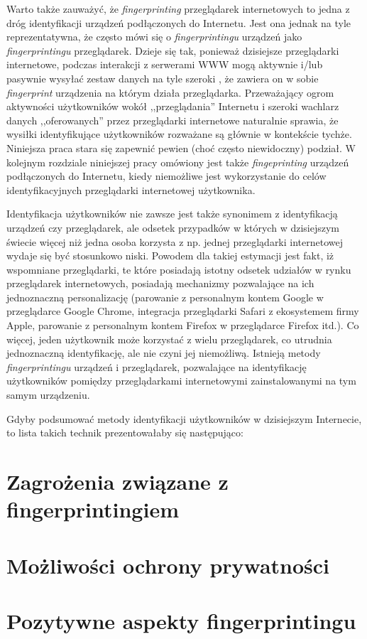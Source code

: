 Warto także zauważyć, że \emph{fingerprinting} przeglądarek internetowych to
jedna z dróg identyfikacji urządzeń podłączonych do Internetu. Jest ona jednak
na tyle reprezentatywna, że często mówi się o \emph{fingerprintingu} urządzeń
jako \emph{fingerprintingu} przeglądarek. Dzieje się tak, ponieważ dzisiejsze
przeglądarki internetowe, podczas interakcji z serwerami WWW mogą aktywnie i/lub
pasywnie wysyłać zestaw danych na tyle szeroki \cite{eckersley2010unique}, że
zawiera on w sobie \emph{fingerprint} urządzenia na którym działa przeglądarka.
Przeważający ogrom aktywności użytkowników wokół ,,przeglądania'' Internetu i
szeroki wachlarz danych ,,oferowanych'' przez przeglądarki internetowe
naturalnie sprawia, że wysiłki identyfikujące użytkowników rozważane są głównie
w kontekście tychże. Niniejsza praca stara się zapewnić pewien (choć często
niewidoczny) podział. W kolejnym rozdziale niniejszej pracy omówiony jest także
\emph{fingeprinting} urządzeń podłączonych do Internetu, kiedy niemożliwe jest
wykorzystanie do celów identyfikacyjnych przeglądarki internetowej użytkownika.

Identyfikacja użytkowników nie zawsze jest także synonimem z identyfikacją
urządzeń czy przeglądarek, ale odsetek przypadków w których w dzisiejszym
świecie więcej niż jedna osoba korzysta z np. jednej przeglądarki internetowej
wydaje się być stosunkowo niski. Powodem dla takiej estymacji jest fakt, iż
wspomniane przeglądarki, te które posiadają istotny odsetek udziałów w rynku
przeglądarek internetowych, posiadają mechanizmy pozwalające na ich jednoznaczną
personalizację (parowanie z personalnym kontem Google w przeglądarce Google
Chrome, integracja przeglądarki Safari z ekosystemem firmy Apple, parowanie z
personalnym kontem Firefox w przeglądarce Firefox itd.). Co więcej, jeden
użytkownik może korzystać z wielu przeglądarek, co utrudnia jednoznaczną
identyfikację, ale nie czyni jej niemożliwą. Istnieją metody
\emph{fingerprintingu} urządzeń i przeglądarek, pozwalające na identyfikację
użytkowników pomiędzy przeglądarkami internetowymi zainstalowanymi na tym samym
urządzeniu.

Gdyby podsumować metody identyfikacji użytkowników w dzisiejszym Internecie, to
lista takich technik prezentowałaby się następująco:

\section{Zagrożenia związane z fingerprintingiem}

\section{Możliwości ochrony prywatności}

\section{Pozytywne aspekty fingerprintingu}
